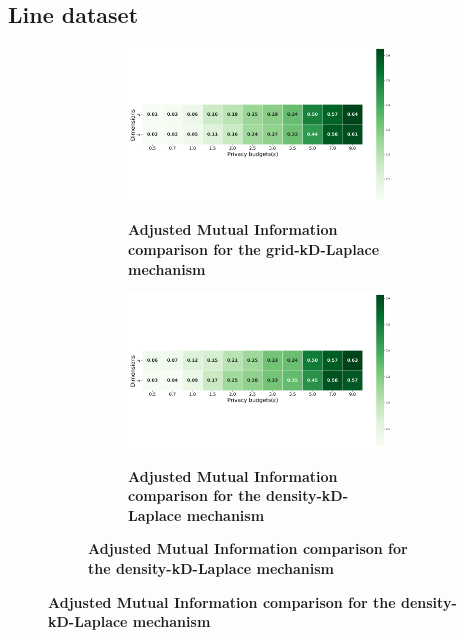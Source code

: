 \subsection{Line dataset} \label{appendix:results-mechanism-utility-line-dataset}
\begin{figure}[H]
    \centering
    \begin{subfigure}[b]{0.90\textwidth}
        \begin{subfigure}[c]{1\textwidth}
            \caption{\textbf{Adjusted Mutual Information comparison for the grid-kD-Laplace mechanism}}
            \includegraphics[width=1\textwidth]{Results/kd-laplace/grid-kd-Laplace/line-dataset/ami.png}
            \label{fig:ami_line-dataset_comparison_grid-kd_2d}
        \end{subfigure}
        \vfill %
        \begin{subfigure}[c]{1\textwidth}
            \caption{\textbf{Adjusted Mutual Information comparison for the density-kD-Laplace mechanism}}
            \includegraphics[width=1\textwidth]{Results/kd-laplace/density-kd-Laplace/line-dataset/ami.png}
            \label{fig:ami_line-dataset_comparison_density-kd_2d}
        \end{subfigure}
    \end{subfigure}
\end{figure}
\newpage
